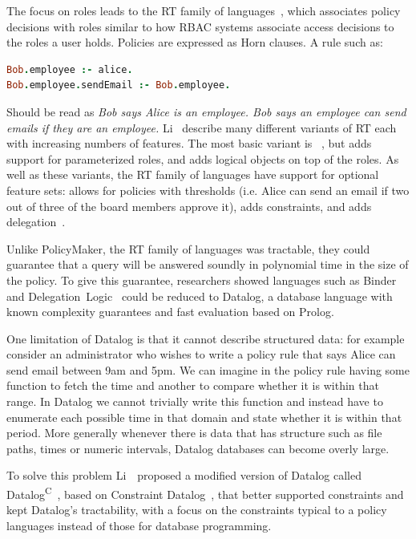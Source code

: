 \documentclass[thesis.tex]{subfiles}
\begin{document}
The focus on roles leads to the RT family of
languages~\cite{ninghui_li_design_2002}, which associates policy
decisions with roles similar to how \ac{RBAC} systems associate access
decisions to the roles a user holds.  Policies are expressed as Horn
clauses.  A rule such as:

\begin{lstlisting}[language=prolog]
Bob.employee :- alice.
Bob.employee.sendEmail :- Bob.employee.
\end{lstlisting}

Should be read as \emph{Bob says Alice is an employee.  Bob says an
employee can send emails if they are an employee.}  Li~\etal{}
describe many different variants of RT each with increasing numbers of
features.  The most basic variant is
~\cite{li_distributed_2003}, but  adds support for
parameterized roles, and  adds logical objects on top of the
roles.  As well as these variants, the RT family of languages have
support for optional feature sets:  allows for policies with
thresholds (i.e. Alice can send an email if two out of three of the
board members approve it),  adds constraints, and 
adds delegation~\cite{ninghui_li_design_2002}.

Unlike PolicyMaker, the RT family of languages was tractable, they could
guarantee that a query will be answered soundly in polynomial time in the size
of the policy. To give this guarantee, researchers showed languages such as
Binder~\cite{detreville_binder_2002} and
Delegation~Logic~\cite{li_delegation_2003,li_practically_2000} could be reduced
to Datalog, a database language with known complexity guarantees and fast
evaluation based on Prolog.

One limitation of Datalog is that it cannot describe structured data: for
example consider an administrator who wishes to write a policy rule that says
Alice can send email between 9am and 5pm. We can imagine in the policy rule
having some function to fetch the time and another to compare whether it is
within that range. In Datalog we cannot trivially write this function and
instead have to enumerate each possible time in that domain and state whether it
is within that period. More generally whenever there is data that has structure
such as file paths, times or numeric intervals, Datalog databases can become
overly large.

To solve this problem Li~\etal{}~proposed a modified version of
Datalog called Datalog\textsuperscript{C}~\cite{li_datalog_2003},
based on Constraint
Datalog~\cite{revesz_constraint_1995,revesz_safe_1998}, that better
supported constraints and kept Datalog's tractability, with a focus on
the constraints typical to a policy languages instead of those for
database programming.
\end{document}
